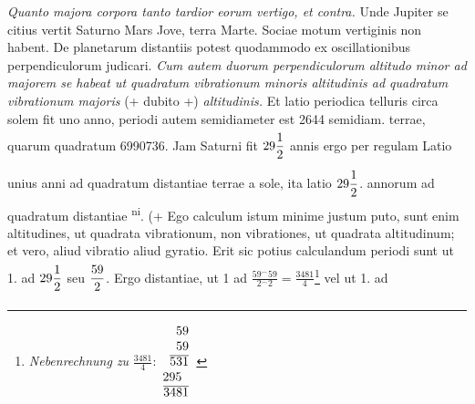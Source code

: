  \pstart[91 v\textsuperscript{o}]  \textit{Quanto majora  corpora tanto tardior eorum vertigo, et  contra.} Unde Jupiter\protect{} se citius vertit Saturno\protect{} Mars\protect{} Jove\protect{}, terra\protect{} Marte\protect{}. Sociae motum  vertiginis non habent.\pend \pstart {} De planetarum\protect{}  distantiis potest quodammodo ex oscillationibus\protect{}  perpendiculorum judicari. \textit{Cum autem duorum  perpendiculorum altitudo minor ad majorem  se habeat ut quadratum vibrationum minoris  altitudinis ad quadratum vibrationum majoris} (+ dubito +) \textit{altitudinis.} Et latio periodica  telluris circa solem\protect{} fit uno anno, periodi autem semidiameter est 2644 semidiam. terrae\protect{}, quarum quadratum 6990736. Jam Saturni\protect{} fit $\displaystyle29\frac{1}{2}\rule[-4mm]{0mm}{10mm}$ annis ergo per  regulam  Latio unius  anni ad quadratum distantiae terrae\protect{} a sole\protect{}, ita latio $\displaystyle29\frac{1}{2}\rule[-4mm]{0mm}{10mm}$. annorum ad  quadratum distantiae \saturn\textsuperscript{ni}. (+ Ego calculum  istum minime justum puto, sunt enim  altitudines, ut quadrata vibrationum, non  vibrationes, ut quadrata altitudinum; et  vero, aliud vibratio aliud gyratio.  Erit sic potius calculandum periodi  sunt ut 1. ad $\displaystyle29\frac{1}{2}\rule[-4mm]{0mm}{10mm}$ seu $\displaystyle\frac{59}{2}\rule[-4mm]{0mm}{10mm}$.  Ergo distantiae, ut 1 ad $\displaystyle\frac{59^\smallfrown 59}{2^\smallfrown 2}=\frac{3481}{4}$\footnote{\textit{Nebenrechnung zu} $\displaystyle\frac{3481}{4}$:\newline$\protect\begin{array}{r}59\\59\\\overline{531}\\295\protect\rule[0pt]{5.5pt}{0pt}\\\overline{3481}
\protect\end{array}$}  vel ut 1. ad
